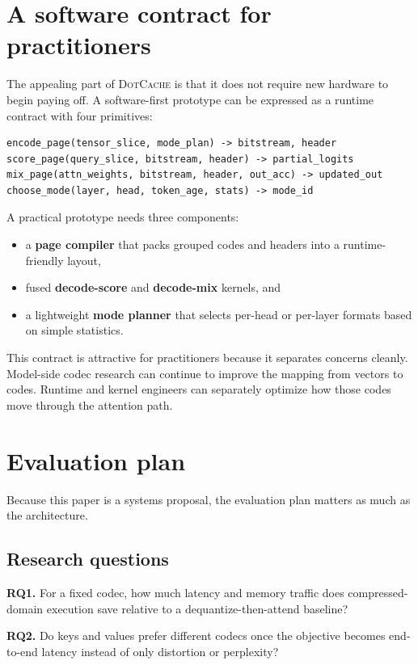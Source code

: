 \documentclass[11pt]{article}
\newcommand{\method}{\textsc{DotCache}}
\begin{document}
\section{A software contract for practitioners}

The appealing part of \method{} is that it does not require new hardware to begin paying off. A software-first prototype can be expressed as a runtime contract with four primitives:

\begin{verbatim}
encode_page(tensor_slice, mode_plan) -> bitstream, header
score_page(query_slice, bitstream, header) -> partial_logits
mix_page(attn_weights, bitstream, header, out_acc) -> updated_out
choose_mode(layer, head, token_age, stats) -> mode_id
\end{verbatim}

A practical prototype needs three components:
\begin{itemize}
    \item a \textbf{page compiler} that packs grouped codes and headers into a runtime-friendly layout,
    \item fused \textbf{decode-score} and \textbf{decode-mix} kernels, and
    \item a lightweight \textbf{mode planner} that selects per-head or per-layer formats based on simple statistics.
\end{itemize}

This contract is attractive for practitioners because it separates concerns cleanly. Model-side codec research can continue to improve the mapping from vectors to codes. Runtime and kernel engineers can separately optimize how those codes move through the attention path.

\section{Evaluation plan}

Because this paper is a systems proposal, the evaluation plan matters as much as the architecture.

\subsection{Research questions}

\textbf{RQ1.} For a fixed codec, how much latency and memory traffic does compressed-domain execution save relative to a dequantize-then-attend baseline?

\textbf{RQ2.} Do keys and values prefer different codecs once the objective becomes end-to-end latency instead of only distortion or perplexity?
\end{document}
